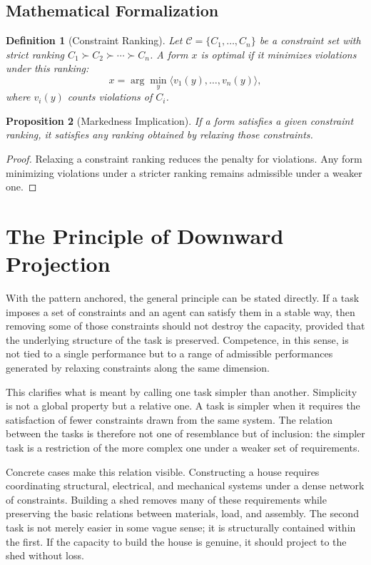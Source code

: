 \documentclass[12pt, a4paper]{article}
\newtheorem{definition}{Definition}[section]
\newtheorem{proposition}[definition]{Proposition}
\begin{document}
\subsection*{Mathematical Formalization}

\begin{definition}[Constraint Ranking]
Let $\mathcal{C} = \{C_1, \dots, C_n\}$ be a constraint set with strict ranking $C_1 \succ C_2 \succ \cdots \succ C_n$. A form $x$ is optimal if it minimizes violations under this ranking:
\[
x = \arg\min_{y} \langle v_1(y), \dots, v_n(y) \rangle,
\]
where $v_i(y)$ counts violations of $C_i$.
\end{definition}

\begin{proposition}[Markedness Implication]
If a form satisfies a given constraint ranking, it satisfies any ranking obtained by relaxing those constraints.
\end{proposition}

\begin{proof}
Relaxing a constraint ranking reduces the penalty for violations. Any form minimizing violations under a stricter ranking remains admissible under a weaker one.
\end{proof}


\section{The Principle of Downward Projection}

With the pattern anchored, the general principle can be stated directly. If a task imposes a set of constraints and an agent can satisfy them in a stable way, then removing some of those constraints should not destroy the capacity, provided that the underlying structure of the task is preserved. Competence, in this sense, is not tied to a single performance but to a range of admissible performances generated by relaxing constraints along the same dimension.

This clarifies what is meant by calling one task simpler than another. Simplicity is not a global property but a relative one. A task is simpler when it requires the satisfaction of fewer constraints drawn from the same system. The relation between the tasks is therefore not one of resemblance but of inclusion: the simpler task is a restriction of the more complex one under a weaker set of requirements.

Concrete cases make this relation visible. Constructing a house requires coordinating structural, electrical, and mechanical systems under a dense network of constraints. Building a shed removes many of these requirements while preserving the basic relations between materials, load, and assembly. The second task is not merely easier in some vague sense; it is structurally contained within the first. If the capacity to build the house is genuine, it should project to the shed without loss.
\end{document}
